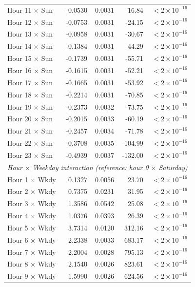 \documentclass[11pt, letterpaper]{article}
\begin{document}
\begin{longtable}{lrrrr}
Hour 11 $\times$ Sun  & -0.0530 & 0.0031 &  -16.84 & $<2\times10^{-16}$ \\
Hour 12 $\times$ Sun  & -0.0753 & 0.0031 &  -24.15 & $<2\times10^{-16}$ \\
Hour 13 $\times$ Sun  & -0.0958 & 0.0031 &  -30.67 & $<2\times10^{-16}$ \\
Hour 14 $\times$ Sun  & -0.1384 & 0.0031 &  -44.29 & $<2\times10^{-16}$ \\
Hour 15 $\times$ Sun  & -0.1739 & 0.0031 &  -55.71 & $<2\times10^{-16}$ \\
Hour 16 $\times$ Sun  & -0.1615 & 0.0031 &  -52.21 & $<2\times10^{-16}$ \\
Hour 17 $\times$ Sun  & -0.1665 & 0.0031 &  -53.92 & $<2\times10^{-16}$ \\
Hour 18 $\times$ Sun  & -0.2214 & 0.0031 &  -70.85 & $<2\times10^{-16}$ \\
Hour 19 $\times$ Sun  & -0.2373 & 0.0032 &  -73.75 & $<2\times10^{-16}$ \\
Hour 20 $\times$ Sun  & -0.2015 & 0.0033 &  -60.19 & $<2\times10^{-16}$ \\
Hour 21 $\times$ Sun  & -0.2457 & 0.0034 &  -71.78 & $<2\times10^{-16}$ \\
Hour 22 $\times$ Sun  & -0.3708 & 0.0035 & -104.99 & $<2\times10^{-16}$ \\
Hour 23 $\times$ Sun  & -0.4939 & 0.0037 & -132.00 & $<2\times10^{-16}$ \\
\hline
\multicolumn{5}{l}{\textit{Hour $\times$ Weekday interaction (reference: hour 0 $\times$ Saturday)}} \\
Hour 1  $\times$ Wkdy &  0.1327 & 0.0056 &   23.70 & $<2\times10^{-16}$ \\
Hour 2  $\times$ Wkdy &  0.7375 & 0.0231 &   31.95 & $<2\times10^{-16}$ \\
Hour 3  $\times$ Wkdy &  1.3586 & 0.0542 &   25.08 & $<2\times10^{-16}$ \\
Hour 4  $\times$ Wkdy &  1.0376 & 0.0393 &   26.39 & $<2\times10^{-16}$ \\
Hour 5  $\times$ Wkdy &  3.7314 & 0.0120 &  312.16 & $<2\times10^{-16}$ \\
Hour 6  $\times$ Wkdy &  2.2338 & 0.0033 &  683.17 & $<2\times10^{-16}$ \\
Hour 7  $\times$ Wkdy &  2.2004 & 0.0028 &  795.13 & $<2\times10^{-16}$ \\
Hour 8  $\times$ Wkdy &  2.1540 & 0.0026 &  823.61 & $<2\times10^{-16}$ \\
Hour 9  $\times$ Wkdy &  1.5990 & 0.0026 &  624.56 & $<2\times10^{-16}$ \\

\end{longtable}
\end{document}
